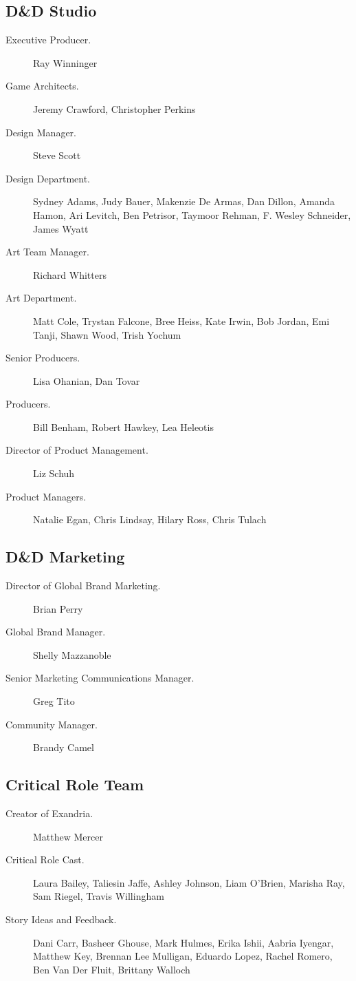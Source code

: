 \documentclass[letterpaper, 11pt, bg=full, twocolumn]{dndbook}
\begin{document}
\subsection{D\&D Studio}

\begin{description}
\item[Executive Producer.] Ray Winninger
\item[Game Architects.] Jeremy Crawford, Christopher Perkins
\item[Design Manager.] Steve Scott
\item[Design Department.] Sydney Adams, Judy Bauer, Makenzie De Armas, Dan Dillon, Amanda Hamon, Ari Levitch, Ben Petrisor, Taymoor Rehman, F. Wesley Schneider, James Wyatt
\item[Art Team Manager.] Richard Whitters
\item[Art Department.] Matt Cole, Trystan Falcone, Bree Heiss, Kate Irwin, Bob Jordan, Emi Tanji, Shawn Wood, Trish Yochum
\item[Senior Producers.] Lisa Ohanian, Dan Tovar
\item[Producers.] Bill Benham, Robert Hawkey, Lea Heleotis
\item[Director of Product Management.] Liz Schuh
\item[Product Managers.] Natalie Egan, Chris Lindsay, Hilary Ross, Chris Tulach
\end{description}
\subsection{D\&D Marketing}

\begin{description}
\item[Director of Global Brand Marketing.] Brian Perry
\item[Global Brand Manager.] Shelly Mazzanoble
\item[Senior Marketing Communications Manager.] Greg Tito
\item[Community Manager.] Brandy Camel
\end{description}
\subsection{Critical Role Team}

\begin{description}
\item[Creator of Exandria.] Matthew Mercer
\item[Critical Role Cast.] Laura Bailey, Taliesin Jaffe, Ashley Johnson, Liam O'Brien, Marisha Ray, Sam Riegel, Travis Willingham
\item[Story Ideas and Feedback.] Dani Carr, Basheer Ghouse, Mark Hulmes, Erika Ishii, Aabria Iyengar, Matthew Key, Brennan Lee Mulligan, Eduardo Lopez, Rachel Romero, Ben Van Der Fluit, Brittany Walloch
\end{description}
\end{document}
